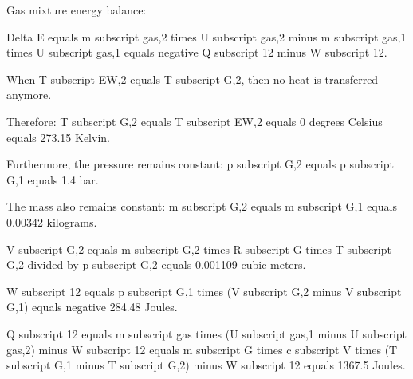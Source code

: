 Gas mixture energy balance:  

Delta E equals m subscript gas,2 times U subscript gas,2 minus m subscript gas,1 times U subscript gas,1 equals negative Q subscript 12 minus W subscript 12.  

When T subscript EW,2 equals T subscript G,2, then no heat is transferred anymore.  

Therefore: T subscript G,2 equals T subscript EW,2 equals 0 degrees Celsius equals 273.15 Kelvin.  

Furthermore, the pressure remains constant: p subscript G,2 equals p subscript G,1 equals 1.4 bar.  

The mass also remains constant: m subscript G,2 equals m subscript G,1 equals 0.00342 kilograms.  

V subscript G,2 equals m subscript G,2 times R subscript G times T subscript G,2 divided by p subscript G,2 equals 0.001109 cubic meters.  

W subscript 12 equals p subscript G,1 times (V subscript G,2 minus V subscript G,1) equals negative 284.48 Joules.  

Q subscript 12 equals m subscript gas times (U subscript gas,1 minus U subscript gas,2) minus W subscript 12 equals m subscript G times c subscript V times (T subscript G,1 minus T subscript G,2) minus W subscript 12 equals 1367.5 Joules.